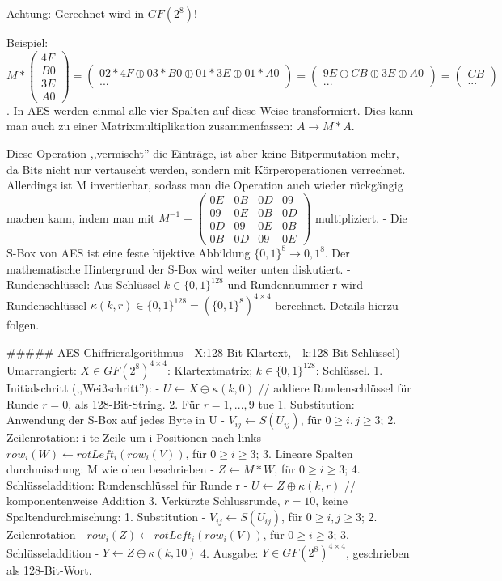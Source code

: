 \documentclass[a4paper]{article}
\begin{document}
\begin{multicols}{3}
    Achtung: Gerechnet wird in $GF(2^8)$!

    Beispiel: $M*\begin{pmatrix} 4F\\ B0\\ 3E\\ A0\end{pmatrix} = \begin{pmatrix} 02*4F\oplus 03*B0\oplus 01*3E\oplus 01*A0\\ ... \end{pmatrix} = \begin{pmatrix} 9E\oplus CB\oplus 3E\oplus A0 \\ ... \end{pmatrix} = \begin{pmatrix} CB\\...\end{pmatrix}$.
    In AES werden einmal alle vier Spalten auf diese Weise transformiert. Dies kann man auch zu einer Matrixmultiplikation zusammenfassen: $A \rightarrow M*A$.

    Diese Operation ,,vermischt'' die Einträge, ist aber keine Bitpermutation mehr, da Bits nicht nur vertauscht werden, sondern mit Körperoperationen verrechnet. Allerdings ist M invertierbar, sodass man die Operation auch wieder rückgängig machen kann, indem man mit $M^{-1}=\begin{pmatrix} 0E& 0B& 0D& 09\\ 09& 0E& 0B& 0D\\ 0D& 09& 0E& 0B\\ 0B& 0D& 09& 0E\end{pmatrix}$ multipliziert.
    - Die S-Box von AES ist eine feste bijektive Abbildung $\{0,1\}^8\rightarrow {0,1}^8$. Der mathematische Hintergrund der S-Box wird weiter unten diskutiert.
    - Rundenschlüssel: Aus Schlüssel $k\in\{0,1\}^{128}$ und Rundennummer r wird Rundenschlüssel $\kappa (k,r)\in\{0,1\}^{128}=(\{0,1\}^8)^{4\times 4}$ berechnet. Details hierzu folgen.

    ##### AES-Chiffrieralgorithmus
    - X:128-Bit-Klartext,
    - k:128-Bit-Schlüssel)
    - Umarrangiert: $X\in GF(2^8)^{4\times 4}$: Klartextmatrix; $k\in\{0,1\}^{128}$: Schlüssel.
    1. Initialschritt (,,Weißschritt''):
    - $U\leftarrow X\oplus \kappa (k,0)$ // addiere Rundenschlüssel für Runde $r=0$, als 128-Bit-String.
    2. Für $r=1,...,9$ tue
    1. Substitution: Anwendung der S-Box auf jedes Byte in U
    - $V_{ij}\leftarrow S(U_{ij})$, für $0\geq i,j\geq 3$;
    2. Zeilenrotation: i-te Zeile um i Positionen nach links
    - $row_i(W)\leftarrow rotLeft_i(row_i(V))$, für $0\geq i\geq 3$;
    3. Lineare Spalten durchmischung: M wie oben beschrieben
    - $Z\leftarrow M*W$, für $0\geq i\geq 3$;
    4. Schlüsseladdition: Rundenschlüssel für Runde r
    - $U\leftarrow Z\oplus \kappa (k,r)$ // komponentenweise Addition
    3. Verkürzte Schlussrunde, $r=10$, keine Spaltendurchmischung:
    1. Substitution
    - $V_{ij}\leftarrow S(U_{ij})$, für $0\geq i,j\geq 3$;
    2. Zeilenrotation
    - $row_i(Z)\leftarrow rotLeft_i(row_i(V))$, für $0\geq i\geq 3$;
    3. Schlüsseladdition
    - $Y\leftarrow Z\oplus \kappa (k,10)$
    4. Ausgabe: $Y\in GF(2^8)^{4\times 4}$, geschrieben als 128-Bit-Wort.


\end{multicols}
\end{document}
